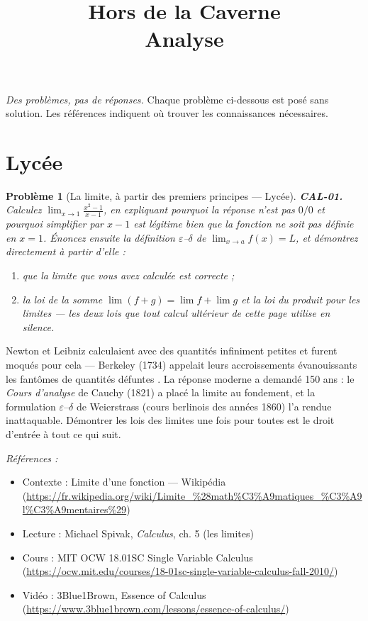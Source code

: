 \documentclass[11pt]{article}
\title{Hors de la Caverne \\ \Large Analyse}
\author{}
\date{}
\newtheorem{problem}{Problème}
\newenvironment{refs}{\par\small\noindent\emph{Références :}\begin{itemize}\setlength\itemsep{0pt}}{\end{itemize}\normalsize}
\begin{document}
\maketitle
\noindent\emph{Des problèmes, pas de réponses.} Chaque problème ci-dessous est posé
sans solution. Les références indiquent où trouver les connaissances nécessaires.
\medskip


\section*{Lycée}

\begin{problem}[{La limite, à partir des premiers principes --- Lycée}]
\textbf{CAL-01.} Calculez
$ \lim_{x\to 1} \frac{x^2-1}{x-1} $,
en expliquant pourquoi la réponse n'est pas \og{} $0/0$ \fg{} et pourquoi simplifier par $ x-1 $ est
légitime bien que la fonction ne soit pas définie en $ x=1 $. Énoncez ensuite la définition
$\varepsilon$--$\delta$ de $ \lim_{x\to a} f(x)=L $, et démontrez directement à partir d'elle :
\begin{enumerate}
\item[(i)] que la limite que vous
avez calculée est correcte ;
\item[(ii)] la loi de la somme
$ \lim (f+g) = \lim f + \lim g $ et la loi du produit pour les limites --- les deux lois que
tout calcul ultérieur de cette page utilise en silence.
\end{enumerate}

\end{problem}

\noindent Newton et Leibniz calculaient avec des quantités \og{} infiniment petites \fg{}
et furent moqués pour cela --- Berkeley (1734) appelait leurs accroissements évanouissants
\og{} les fantômes de quantités défuntes \fg{}. La réponse moderne a demandé 150 ans : le
\textit{Cours d'analyse} de Cauchy (1821) a placé la limite au fondement, et la formulation
$\varepsilon$--$\delta$ de Weierstrass (cours berlinois des années 1860) l'a rendue inattaquable. Démontrer les lois
des limites une fois pour toutes est le droit d'entrée à tout ce qui suit.

\begin{refs}
\item Contexte : Limite d'une fonction --- Wikipédia (\url{https://fr.wikipedia.org/wiki/Limite_%28math%C3%A9matiques_%C3%A9l%C3%A9mentaires%29})
\item Lecture : Michael Spivak, \textit{Calculus}, ch. 5 (les limites)
\item Cours : MIT OCW 18.01SC Single Variable Calculus (\url{https://ocw.mit.edu/courses/18-01sc-single-variable-calculus-fall-2010/})
\item Vidéo : 3Blue1Brown, Essence of Calculus (\url{https://www.3blue1brown.com/lessons/essence-of-calculus/})
\end{refs}
\end{document}
